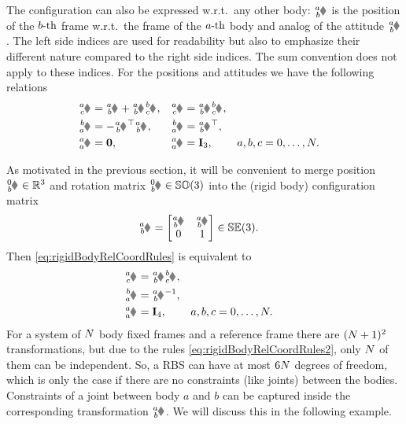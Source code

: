 The configuration can also be expressed w.r.t.\ any other body: $\bodyPos{\BidxI}{\BidxII}$ is the position of the $b\text{-th}$ frame w.r.t.\ the frame of the $a\text{-th}$ body and analog of the attitude $\bodyRot{\BidxI}{\BidxII}$.
The left side indices are used for readability but also to emphasize their different nature compared to the right side indices.
The sum convention does not apply to these indices.
For the positions and attitudes we have the following relations
\begin{subequations}\label{eq:rigidBodyRelCoordRules}
\begin{align}
 \bodyPos{\BidxI}{\BidxIII} &= \bodyPos{\BidxI}{\BidxII} + \bodyRot{\BidxI}{\BidxII} \bodyPos{\BidxII}{\BidxIII},&
 \bodyRot{\BidxI}{\BidxIII} &= \bodyRot{\BidxI}{\BidxII} \bodyRot{\BidxII}{\BidxIII},
\\
 \bodyPos{\BidxII}{\BidxI} &= -\bodyRot{\BidxI}{\BidxII}^\top \bodyPos{\BidxI}{\BidxII},&
 \bodyRot{\BidxII}{\BidxI} &= \bodyRot{\BidxI}{\BidxII}^\top,&
\\
 \bodyPos{\BidxI}{\BidxI} &= \tuple{0},&
 \bodyRot{\BidxI}{\BidxI} &= \idMat[3],&
 \BidxI, \BidxII, \BidxIII &= 0,\ldots,\numRigidBodies.
\end{align}
\end{subequations}

As motivated in the previous section, it will be convenient to merge position $\bodyPos{0}{\BidxII} \in \RealNum^3$ and rotation matrix $\bodyRot{0}{\BidxII} \in \SpecialOrthogonalGroup(3)$ into the (rigid body) configuration matrix
\begin{align}
 \bodyHomoCoord{\BidxI}{\BidxII}{}{} &= \begin{bmatrix} \bodyRot{\BidxI}{\BidxII} & \bodyPos{\BidxI}{\BidxII}{} \\ 0 & 1 \end{bmatrix} \in \SpecialEuclideanGroup(3).
\end{align}
Then \eqref{eq:rigidBodyRelCoordRules} is equivalent to
\begin{subequations}\label{eq:rigidBodyRelCoordRules2}
\begin{align}
 \bodyHomoCoord{\BidxI}{\BidxIII} &= \bodyHomoCoord{\BidxI}{\BidxII} \bodyHomoCoord{\BidxII}{\BidxIII},
\\
 \bodyHomoCoord{\BidxII}{\BidxI} &= \bodyHomoCoord{\BidxI}{\BidxII}^{-1},
 \\
 \bodyHomoCoord{\BidxI}{\BidxI} &= \idMat[4],&
 \BidxI, \BidxII, \BidxIII &= 0,\ldots,\numRigidBodies.
\end{align}
\end{subequations}
For a system of $N$ body fixed frames and a reference frame there are $(N+1)^2$ transformations, but due to the rules \eqref{eq:rigidBodyRelCoordRules2}, only $N$ of them can be independent.
So, a RBS can have at most $6N$ degrees of freedom, which is only the case if there are no constraints (like joints) between the bodies.
Constraints of a joint between body $a$ and $b$ can be captured inside the corresponding transformation $\bodyHomoCoord{\BidxI}{\BidxII}{}{}$.
We will discuss this in the following example.

